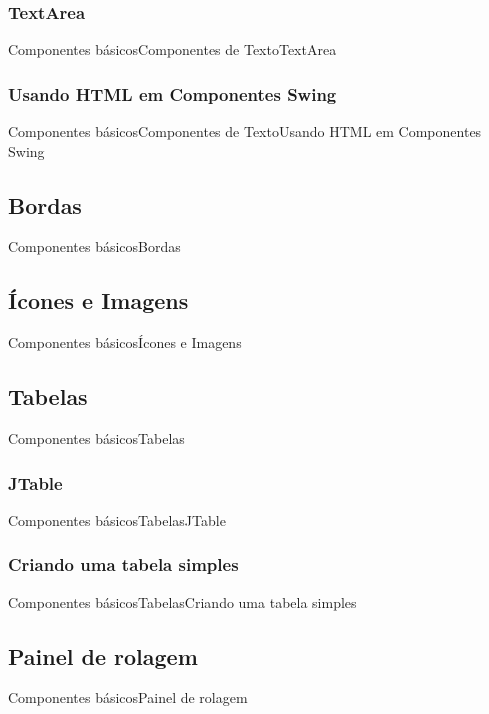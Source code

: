 \documentclass[10pt]{beamer}
\begin{document}
\subsubsection{TextArea}
\begin{frame}{Componentes básicos}{Componentes de Texto}{TextArea}
\end{frame}{}
\subsubsection{Usando HTML em Componentes Swing}
\begin{frame}{Componentes básicos}{Componentes de Texto}{Usando HTML em Componentes Swing}
\end{frame}{}
\subsection{Bordas}
\begin{frame}{Componentes básicos}{Bordas}
\end{frame}{}
\subsection{Ícones e Imagens}
\begin{frame}{Componentes básicos}{Ícones e Imagens}
\end{frame}{}
\subsection{Tabelas}
\begin{frame}{Componentes básicos}{Tabelas}
\end{frame}{}
\subsubsection{JTable}
\begin{frame}{Componentes básicos}{Tabelas}{JTable}
\end{frame}{}
\subsubsection{Criando uma tabela simples}
\begin{frame}{Componentes básicos}{Tabelas}{Criando uma tabela simples}
\end{frame}{}
\subsection{Painel de rolagem}
\begin{frame}{Componentes básicos}{Painel de rolagem}
\end{frame}{}
\end{document}
